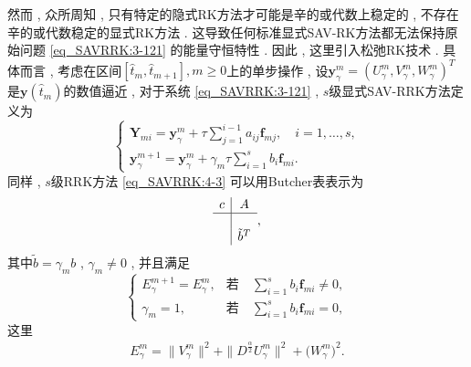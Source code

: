 然而 , 众所周知 , 只有特定的隐式RK方法才可能是辛的或代数上稳定的 , 不存在辛的或代数稳定的显式RK方法 . 
这导致任何标准显式SAV-RK方法都无法保持原始问题 \eqref{eq_SAVRRK:3-121} 的能量守恒特性 . 
因此 , 这里引入松弛RK技术 . 具体而言 , 考虑在区间$\left[\hat{t}_m , \hat{t}_{m+1}\right] , m \geq 0$上的单步操作 , 设$\bm{y}_\gamma^m=\left(U^{m}_{\gamma} , V^{m}_{\gamma} , W^{m}_{\gamma}\right)^T$是$\bm{y}\left(\hat{t}_m\right)$的数值逼近 , 
对于系统 \eqref{eq_SAVRRK:3-121} , $s$级显式SAV-RRK方法定义为
\begin{equation}
\left\{\begin{array}{l}
\bm{Y}_{m i}=\bm{y}_\gamma^m+\tau \sum\limits_{j=1}^{i-1} a_{i j} \bm{f}_{m j} , \quad i=1 , \ldots , s , \\
\bm{y}_\gamma^{m+1}=\bm{y}_\gamma^m+\gamma_m \tau \sum\limits_{i=1}^s b_i \bm{f}_{m i} . 
\end{array}\right . \label{eq_SAVRRK:4-3}
\end{equation}
同样 , $s$级RRK方法 \eqref{eq_SAVRRK:4-3} 可以用Butcher表表示为
\begin{equation}
\begin{array}{c|c}
c & A \\
\hline \\
& \tilde{b}^T
\end{array} , 
\end{equation}
其中$\tilde{b}=\gamma_m b$ , $\gamma_m\neq 0$ , 并且满足
\begin{equation}
\left\{\begin{array}{ll}
E_{\gamma}^{m+1}=E_{\gamma}^{m} , & \text{若} \quad  \sum\limits_{i=1}^s b_i \bm{f}_{m i} \neq 0 , \\
\gamma_m=1 , & \text{若} \quad  \sum\limits_{i=1}^s b_i \bm{f}_{m i} =0 , 
\end{array}\right . \label{eq_SAVRRK:4-6}
\end{equation}
这里
\begin{align}\label{eq_SAVRRK:4-6b}
E_{\gamma}^{m}  =\|V_{\gamma}^{m}\|^2+\|D^\frac{\alpha}{2} U_{\gamma}^{m}\|^2+\big(W_{\gamma}^{m}\big)^2 . 
\end{align}

